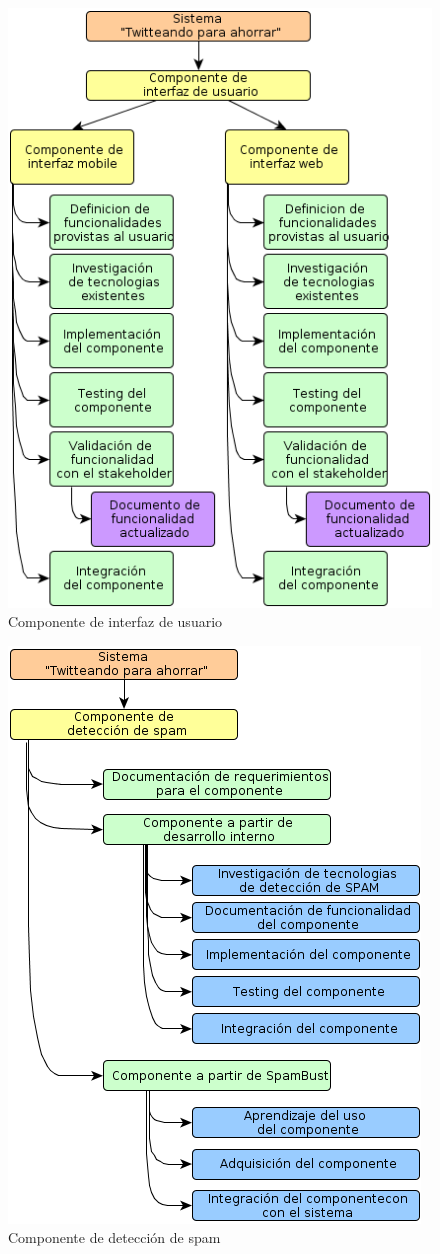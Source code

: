 \documentclass[10pt, a4paper]{article}
\newcommand{\escaladefault}{0.85}
\begin{document}
\begin{figure}[H]
\centering
\includegraphics[scale=\escaladefault]{graficos/wbs/comp_interfaz.png}
\caption{Componente de interfaz de usuario}
\end{figure}

\begin{figure}[H]
\centering
\includegraphics[scale=\escaladefault]{graficos/wbs/comp_de_spam.png}
\caption{Componente de detección de spam}
\end{figure}
\end{document}
